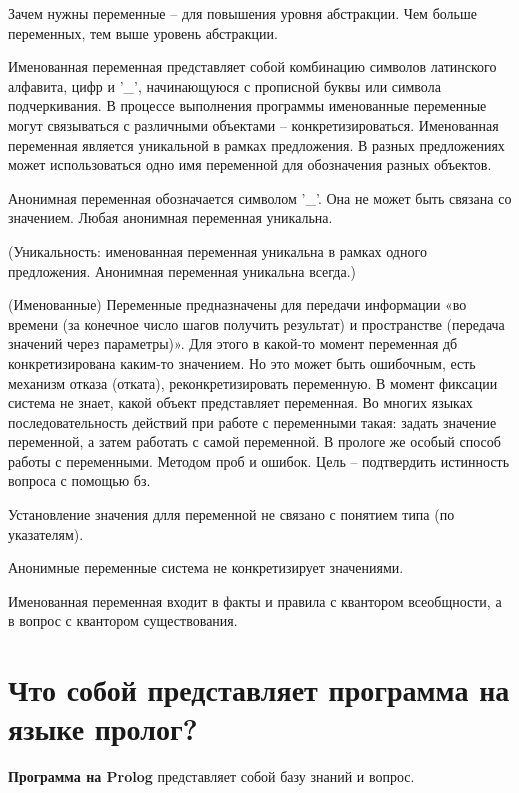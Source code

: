 \documentclass[12pt]{report}
\begin{document}
Зачем нужны переменные -- для повышения уровня абстракции. Чем больше переменных, тем выше уровень абстракции.

Именованная переменная представляет собой комбинацию символов латинского алфавита, цифр и ’\_’, начинающуюся с прописной буквы или символа подчеркивания. В процессе выполнения программы именованные переменные могут связываться с различными объектами – конкретизироваться. Именованная переменная является уникальной в рамках предложения. В разных предложениях может использоваться одно имя переменной для обозначения разных объектов.

Анонимная  переменная обозначается символом ’\_’. Она не может быть связана со значением. Любая анонимная переменная уникальна.

(Уникальность: именованная переменная уникальна в рамках одного предложения. Анонимная переменная уникальна всегда.)

(Именованные) Переменные предназначены для передачи информации «во времени (за конечное число шагов получить результат) и пространстве (передача значений через параметры)». Для этого в какой-то момент переменная дб конкретизирована каким-то значением. Но это может  быть ошибочным, есть механизм отказа (отката), реконкретизировать переменную. В момент фиксации система не знает, какой объект представляет переменная. Во многих языках последовательность действий при работе с переменными такая: задать значение переменной, а затем работать с самой переменной. В прологе же особый способ работы с переменными. Методом проб и ошибок. Цель -- подтвердить истинность вопроса с помощью бз. 

Установление значения длля переменной не связано с понятием типа  (по указателям). 

Анонимные переменные система не конкретизирует значениями.


Именованная переменная входит в факты и правила с квантором всеобщности, а в вопрос с квантором существования.








\section{Что собой представляет программа на языке пролог?}

\textbf{Программа на Prolog} представляет собой базу знаний и вопрос. 
\end{document}
